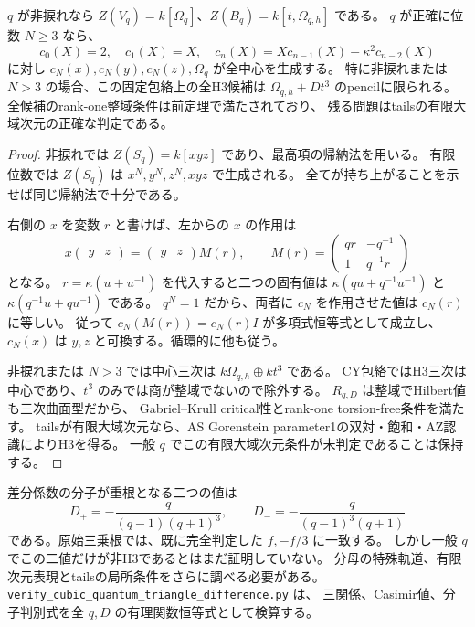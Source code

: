 \begin{proposition}[全候補incidenceと有限位数のChebyshev中心元]
\label{prop:quantum-triangle-all-candidates}
$q$ が非捩れなら $Z(V_q)=k[\Omega_q]$、$Z(B_q)=k[t,\Omega_{q,h}]$ である。
$q$ が正確に位数 $N\ge3$ なら、
\[
 c_0(X)=2,\quad c_1(X)=X,\quad
 c_n(X)=Xc_{n-1}(X)-\kappa^2c_{n-2}(X)
\]
に対し $c_N(x),c_N(y),c_N(z),\Omega_q$ が全中心を生成する。
特に非捩れまたは $N>3$ の場合、この固定包絡上の全H3候補は
$\Omega_{q,h}+Dt^3$ のpencilに限られる。
全候補のrank-one整域条件は前定理で満たされており、
残る問題はtailsの有限大域次元の正確な判定である。
\end{proposition}
\begin{proof}
非捩れでは $Z(S_q)=k[xyz]$ であり、最高項の帰納法を用いる。
有限位数では $Z(S_q)$ は $x^N,y^N,z^N,xyz$ で生成される。
全てが持ち上がることを示せば同じ帰納法で十分である。

右側の $x$ を変数 $r$ と書けば、左からの $x$ の作用は
\[
 x\begin{pmatrix}y&z\end{pmatrix}
 =\begin{pmatrix}y&z\end{pmatrix}
 M(r),\qquad
 M(r)=\begin{pmatrix}qr&-q^{-1}\\1&q^{-1}r\end{pmatrix}
\]
となる。
$r=\kappa(u+u^{-1})$ を代入すると二つの固有値は
$\kappa(qu+q^{-1}u^{-1})$ と $\kappa(q^{-1}u+qu^{-1})$ である。
$q^N=1$ だから、両者に $c_N$ を作用させた値は $c_N(r)$ に等しい。
従って $c_N(M(r))=c_N(r)I$ が多項式恒等式として成立し、
$c_N(x)$ は $y,z$ と可換する。循環的に他も従う。

非捩れまたは $N>3$ では中心三次は
$k\Omega_{q,h}\oplus kt^3$ である。
CY包絡ではH3三次は中心であり、$t^3$ のみでは商が整域でないので除外する。
$R_{q,D}$ は整域でHilbert値も三次曲面型だから、
Gabriel--Krull critical性とrank-one torsion-free条件を満たす。
tailsが有限大域次元なら、AS Gorenstein parameter1の双対・飽和・AZ認識によりH3を得る。
一般 $q$ でこの有限大域次元条件が未判定であることは保持する。
\end{proof}

差分係数の分子が重根となる二つの値は
\[
 D_+=-\frac{q}{(q-1)(q+1)^3},\qquad
 D_-=-\frac{q}{(q-1)^3(q+1)}
\]
である。原始三乗根では、既に完全判定した $f,-f/3$ に一致する。
しかし一般 $q$ でこの二値だけが非H3であるとはまだ証明していない。
分母の特殊軌道、有限次元表現とtailsの局所条件をさらに調べる必要がある。
\texttt{verify\_\allowbreak cubic\_\allowbreak quantum\_\allowbreak triangle\_\allowbreak difference.py} は、
三関係、Casimir値、分子判別式を全 $q,D$ の有理関数恒等式として検算する。

